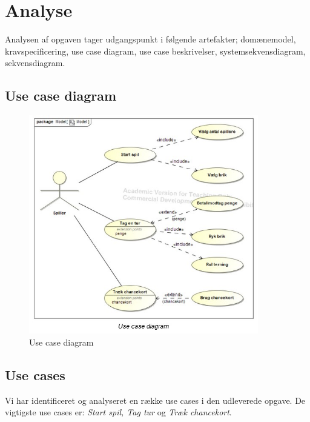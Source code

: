 
\section{Analyse}
Analysen af opgaven tager udgangspunkt i følgende artefakter; domænemodel, kravspecificering, use case diagram, use case beskrivelser, systemsekvensdiagram, sekvensdiagram.



\subsection{Use case diagram}
\begin{figure}[H]
    \includegraphics[width=10cm]{figures/usecasediagram}
    \caption{Use case diagram}
\end{figure}

\subsection{Use cases}
Vi har identificeret og analyseret en række use cases i den udleverede opgave. De vigtigste use cases er: \textit{Start spil, Tag tur} og \textit{Træk chancekort}.

